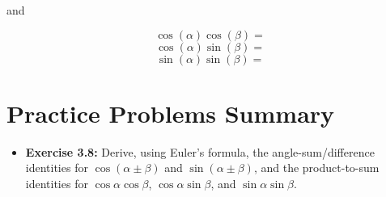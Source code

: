 \documentclass[11pt]{article}
\begin{document}
and

\[\cos(\alpha)\cos(\beta) =\]
\[\cos(\alpha)\sin(\beta) =\]
\[\sin(\alpha)\sin(\beta) =\]

\section*{Practice Problems Summary}

\begin{itemize}
  \item \textbf{Exercise 3.8:} Derive, using Euler's formula, the angle-sum/difference identities for $\cos(\alpha \pm \beta)$ and $\sin(\alpha \pm \beta)$, and the product-to-sum identities for $\cos\alpha\cos\beta$, $\cos\alpha\sin\beta$, and $\sin\alpha\sin\beta$.
\end{itemize}
\end{document}
